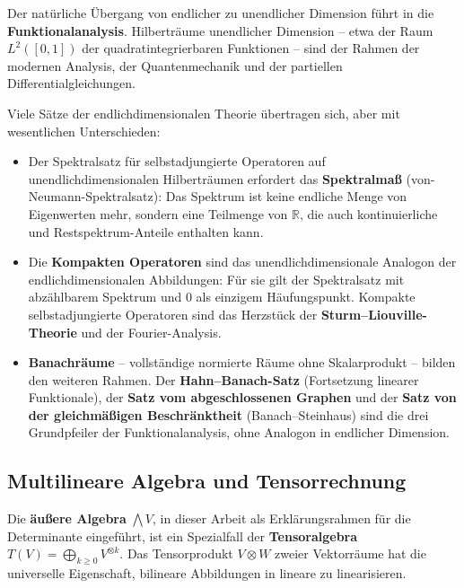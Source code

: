 ﻿\documentclass[a4paper,12pt]{report}
\theoremstyle{definition}
\begin{document}
Der natürliche Übergang von endlicher zu unendlicher Dimension
führt in die \textbf{Funktionalanalysis}. Hilberträume unendlicher
Dimension -- etwa der Raum $L^2([0,1])$ der quadratintegrierbaren
Funktionen -- sind der Rahmen der modernen Analysis, der
Quantenmechanik und der partiellen Differentialgleichungen.

Viele Sätze der endlichdimensionalen Theorie übertragen sich,
aber mit wesentlichen Unterschieden:
\begin{itemize}
    \item[-] Der Spek\-tral\-satz für selbst\-adjungierte Operatoren auf
          un\-end\-lich\-di\-men\-sio\-na\-len Hilbert\-räumen erfordert das
          \textbf{Spektralmaß} (von-Neumann-Spek\-tral\-satz): Das
          Spektrum ist keine endliche Menge von Eigenwerten mehr,
          sondern eine Teilmenge von $\mathbb{R}$, die auch
          kontinuierliche und Restspektrum-Anteile enthalten kann.
    \item[-] Die \textbf{Kompakten Operatoren} sind das un\-end\-lich\-di\-men\-sio\-nale
          Analogon der end\-lich\-di\-men\-sio\-na\-len Abbildungen: Für sie gilt
          der Spektralsatz mit abzählbarem Spektrum und $0$ als
          einzigem Häufungspunkt. Kompakte selbst\-adjungierte Operatoren
          sind das Herzstück der \textbf{Sturm--Liouville-Theorie}
          und der Fourier-Analysis.
    \item[-] \textbf{Banachräume} -- vollständige normierte Räume
          ohne Skalarprodukt -- bilden den weiteren Rahmen.
          Der \textbf{Hahn--Banach-Satz} (Fortsetzung linearer
          Funktionale), der \textbf{Satz vom abgeschlossenen Graphen}
          und der \textbf{Satz von der gleichmäßigen Beschränktheit}
          (Banach--Steinhaus) sind die drei Grundpfeiler der
          Funktionalanalysis, ohne Analogon in endlicher Dimension.
\end{itemize}

\subsection*{Multilineare Algebra und Tensorrechnung}

Die \textbf{äußere Algebra} $\bigwedge V$, in dieser Arbeit als
Erklärungsrahmen für die Determinante eingeführt, ist ein Spezialfall
der \textbf{Tensoralgebra} $T(V) = \bigoplus_{k \geq 0} V^{\otimes k}$.
Das Tensorprodukt $V \otimes W$ zweier Vektorräume hat die universelle
Eigenschaft, bilineare Abbildungen in lineare zu linearisieren.
\end{document}
